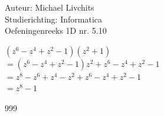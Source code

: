\documentclass[a4paper]{article}
\begin{document}
  
\noindent \large Auteur: Michael Livchits \\
\noindent \large Studierichting: Informatica\\
\noindent \large Oefeningenreeks 1D nr. 5.10\\

\medskip

\normalsize

$(z^6-z^4+z^2-1)(z^2+1)$\\

$= (z^6-z^4+z^2-1)z^2+z^6-z^4+z^2-1$\\

$= z^8-z^6+z^4-z^2+z^6-z^4+z^2-1$\\

$= z^8-1$\\

\begin{thebibliography}{999}
\end{thebibliography}
\end{document}
